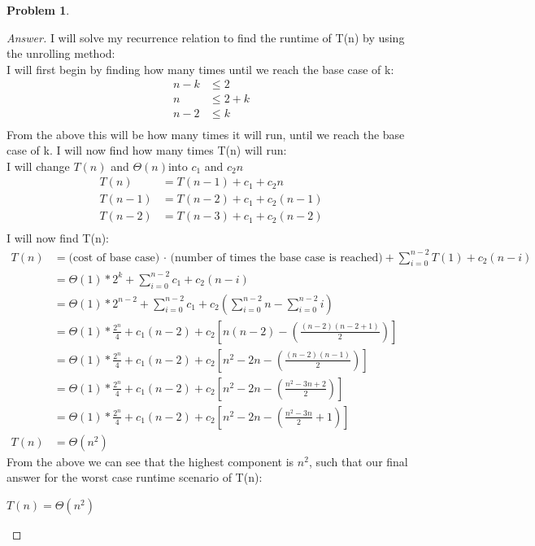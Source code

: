\documentclass[11pt]{article}
\theoremstyle{definition}
\theoremstyle{definition}
\newtheorem{required}{Problem}
\theoremstyle{definition}
\begin{document}
\begin{required}
\begin{enumerate}[label=(\alph*)]
\begin{proof}[Answer]
I will solve my recurrence relation to find the runtime of T(n) by using the unrolling method: \\
I will first begin by finding how many times until we reach the base case of k: \\
\begin{align*}
n-k &\leq 2 \\
n &\leq 2+k \\
n-2 &\leq k \\
\end{align*}
From the above this will be how many times it will run, until we reach the base case of k. 
I will now find how many times T(n) will run: \\
I will change $T(n)$ and $\Theta(n)$into $c_1 $ and $c_2 n$ \\

\begin{align*}
T(n) &= T(n-1) + c_1  + c_2 n \\
T(n-1) &= T(n-2) + c_1  + c_2 (n-1) \\
T(n-2) &= T(n-3) + c_1  + c_2 (n-2) \\
\end{align*}
I will now find T(n): \\
\begin{align*}
T(n) &= \textrm{(cost of base case) · (number of times the base case is reached)} + \sum_{i=0}^{n - 2} T(1) + c_2 (n-i) \\
&= \Theta(1) * 2^k + \sum_{i=0}^{n - 2} c_1 + c_2 (n-i) \\
&= \Theta(1) * 2^{n-2} + \sum_{i=0}^{n - 2} c_1 + c_2(\sum_{i=0}^{n - 2} n - \sum_{i=0}^{n - 2} i)\\
&= \Theta(1) * \frac{2^n}{4} + c_1(n-2) + c_2[n(n-2) - (\frac{(n-2)(n-2+1)}{2})] \\
&= \Theta(1) * \frac{2^n}{4} + c_1(n-2) + c_2[n^2 - 2n -(\frac{(n-2)(n-1)}{2})] \\
&= \Theta(1) * \frac{2^n}{4} + c_1(n-2) + c_2[n^2 - 2n - (\frac{n^2 - 3n + 2}{2})] \\
&= \Theta(1) * \frac{2^n}{4} + c_1(n-2) + c_2[n^2 - 2n - (\frac{n^2 -3n}{2} + 1)] \\
T(n) &= \Theta(n^2)
\end{align*}
From the above we can see that the highest component is $n^2$, such that our final answer for the worst case runtime scenario of T(n): \\
\begin{center}
$T(n) = \Theta(n^2)$
\end{center}
\end{proof}




\end{enumerate}
\end{required}
\end{document}
